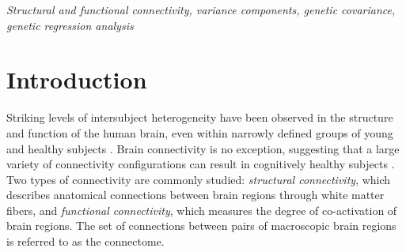 \documentclass[12pt]{article}
\begin{document}
\begin{keywords}
\em Structural and functional connectivity, variance components, genetic covariance, genetic regression analysis
\end{keywords}


\vspace{-3.5mm}

\section{Introduction}


Striking levels of intersubject heterogeneity have been observed in the structure and function of the human brain, even within narrowly defined groups of young and healthy subjects \parencite{benson2022variability}. Brain connectivity is no exception, suggesting that a large variety of connectivity configurations can result in cognitively healthy subjects \parencite{finn2015functional}. Two types of connectivity are commonly studied: \emph{structural connectivity}, which describes anatomical connections between brain regions through white matter fibers, and \emph{functional connectivity}, which measures the degree of co-activation of brain regions. The set of connections between pairs of macroscopic brain regions is referred to as the connectome.
\end{document}
